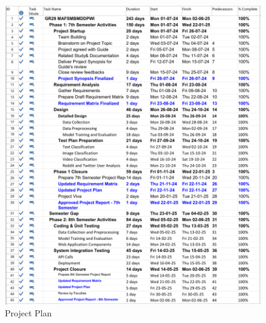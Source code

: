 \pagebreak

\begin{figure}[h!]  
    \centering
    \includegraphics[width=1.0\textwidth]{Images/MS Project Plan Sem 7.png}  
    \caption{Project Plan}
    \label{Project Plan}  %
\end{figure}

\pagebreak

